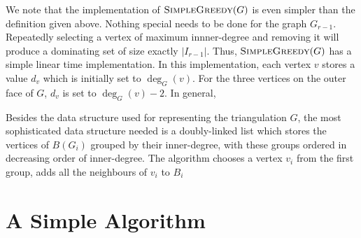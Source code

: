 \documentclass[12pt]{article}
\begin{document}
We note that the implementation of $\textsc{SimpleGreedy}(G)$ is even simpler than the definition given above.  Nothing special needs to be done for the graph $G_{r-1}$.  Repeatedly selecting a vertex of maximum innner-degree and removing it will produce a dominating set of size exactly $|I_{r-1}|$.  Thus, $\textsc{SimpleGreedy}(G)$ has a simple linear time implementation.  In this implementation, each vertex $v$ stores a value $d_v$ which is initially set to $\deg_G(v)$.  For the three vertices on the outer face of $G$, $d_v$ is set to $\deg_G(v)-2$.  In general,





Besides the data structure used for representing the triangulation $G$, the most sophisticated data structure needed is a doubly-linked list which stores the vertices of $B(G_i)$ grouped by their inner-degree, with these groups ordered in decreasing order of inner-degree.  The algorithm chooses a vertex $v_i$ from the first group, adds all the neighbours of $v_i$ to $B_i$




\section{A Simple Algorithm}



\end{document}
